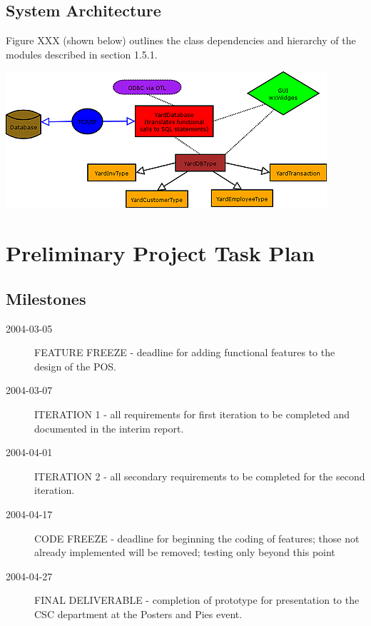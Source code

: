 \documentclass{report}
\begin{document}
    \subsection{System Architecture}

    Figure XXX (shown  below) outlines the class dependencies and hierarchy of
    the modules described in section 1.5.1.


    \includegraphics{yardsale_modules.png}



\section{Preliminary Project Task Plan}

    \subsection{Milestones}
    \begin{description}
        \item[2004-03-05] FEATURE FREEZE - deadline for adding functional
        features to the design of the POS.
        \item[2004-03-07] ITERATION 1 - all requirements for first
        iteration to be completed and documented in the interim
        report.
        \item[2004-04-01] ITERATION 2 - all secondary requirements
        to be completed for the second iteration.
        \item[2004-04-17] CODE FREEZE - deadline for beginning the
        coding of features; those not already implemented will be removed;
        testing only beyond this point
        \item[2004-04-27] FINAL DELIVERABLE - completion of
        prototype for presentation to the CSC department at the
        Posters and Pies event.
    \end{description}
\end{document}

